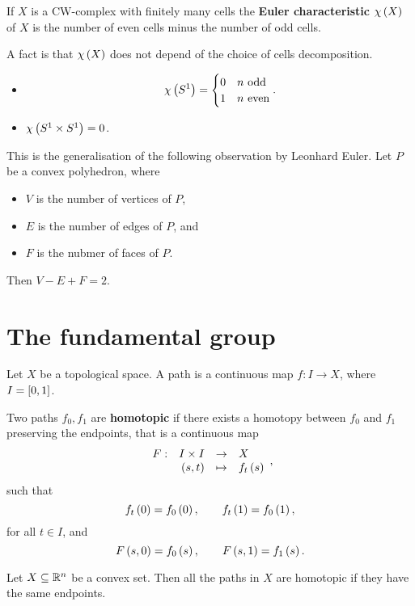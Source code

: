 \begin{definition}
If $ X $ is a CW-complex with finitely many cells the \textbf{Euler characteristic} $ \chi\rb{X} $ of $ X $ is the number of even cells minus the number of odd cells.
\end{definition}

A fact is that $ \chi\rb{X} $ does not depend of the choice of cells decomposition.

\begin{example1}
\hfill
\begin{itemize}
\item
$$ \chi\rb{S^1} =
\begin{cases}
0 & n \ \text{odd} \\
1 & n \ \text{even} \\
\end{cases}.
$$
\item $ \chi\rb{S^1 \times S^1} = 0 $.
\end{itemize}
\end{example1}

This is the generalisation of the following observation by Leonhard Euler. Let $ P $ be a convex polyhedron, where
\begin{itemize}
\item $ V $ is the number of vertices of $ P $,
\item $ E $ is the number of edges of $ P $, and
\item $ F $ is the nubmer of faces of $ P $.
\end{itemize}
Then $ V - E + F = 2 $.

\section{The fundamental group}

Let $ X $ be a topological space. A path is a continuous map $ f : I \to X $, where $ I = \sb{0, 1} $.

\begin{definition}
Two paths $ f_0, f_1 $ are \textbf{homotopic} if there exists a homotopy between $ f_0 $ and $ f_1 $ preserving the endpoints, that is a continuous map
$$ \function[F]{I \times I}{X}{\rb{s, t}}{f_t\rb{s}}, $$
such that
$$ f_t\rb{0} = f_0\rb{0}, \qquad f_t\rb{1} = f_0\rb{1}, $$
for all $ t \in I $, and
$$ F\rb{s, 0} = f_0\rb{s}, \qquad F\rb{s, 1} = f_1\rb{s}. $$
\end{definition}

\begin{example1}
Let $ X \subseteq \R^n $ be a convex set. Then all the paths in $ X $ are homotopic if they have the same endpoints.
\end{example1}

